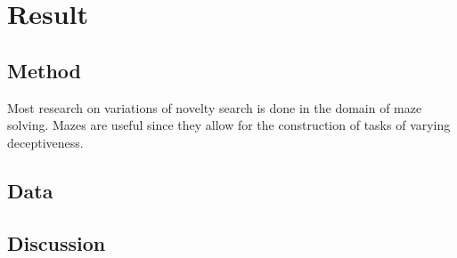 \section{Result}
\label{sec:Result}
\subsection{Method}
Most research on variations of novelty search is done in the domain of maze solving. Mazes are useful
since they allow for the construction of tasks of varying deceptiveness.

\subsection{Data}
\subsection{Discussion}
